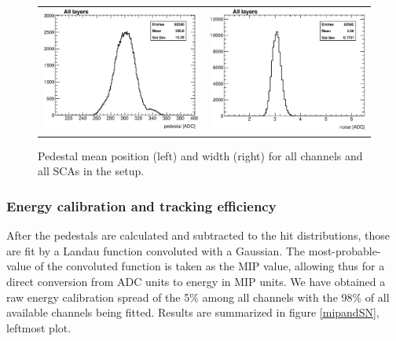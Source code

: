 \documentclass[a4paper,11pt]{article}
\begin{document}
\begin{figure}[!t]
  \centering
  \begin{tabular}{ll}
    \includegraphics[width=2.8in]{../figs/pedestal/h_ped_mean.eps} & \includegraphics[width=2.8in]{../figs/pedestal/h_ped_width.eps}
  \end{tabular}
  \caption{Pedestal mean position (left) and width (right) for all channels and all SCAs in the setup.}
\label{pedestal_all}
\end{figure}

\subsubsection{Energy calibration and tracking efficiency}
\label{sec:mip}

After the pedestals are calculated and subtracted to the hit distributions, those are fit by
a Landau function convoluted with a Gaussian.
The most-probable-value of the convoluted function is taken as the MIP value, allowing thus for a direct
conversion from ADC units to energy in MIP units.
We have obtained a raw energy calibration spread of the 5\% among all channels with the 98\% of all 
available channels being fitted. Results are summarized in figure \ref{mipandSN}, leftmost plot.
\end{document}
